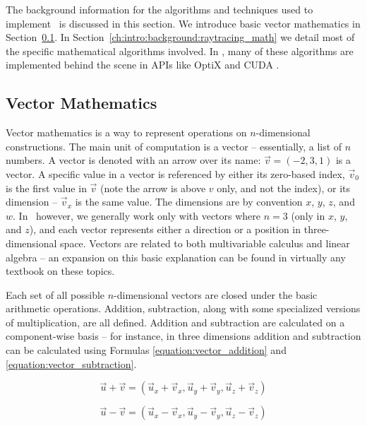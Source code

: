 The background information for the algorithms and techniques used to implement \name\ is discussed in this section.
We introduce basic vector mathematics in Section~\ref{ch:intro:background:vector_math}.
In Section~\ref{ch:intro:background:raytracing_math} we detail most of the specific mathematical algorithms involved.
In \name, many of these algorithms are implemented behind the scene in APIs like OptiX and CUDA .

\subsection{Vector Mathematics}
\label{ch:intro:background:vector_math}

Vector mathematics is a way to represent operations on $n$-dimensional constructions.
The main unit of computation is a vector -- essentially, a list of $n$ numbers.
A vector is denoted with an arrow over its name: $\vec{v} = (-2, 3, 1)$ is a vector.
A specific value in a vector is referenced by either its zero-based index, $\vec{v}_{0}$ is the first value in $\vec{v}$ (note the arrow is above $v$ only, and not the index), or its dimension -- $\vec{v}_x$ is the same value.
The dimensions are by convention $x$, $y$, $z$, and $w$.
In \name\ however, we generally work only with vectors where $n = 3$ (only in $x$, $y$, and $z$), and each vector represents either a direction or a position in three-dimensional space.
Vectors are related to both multivariable calculus and linear algebra -- an expansion on this basic explanation can be found in virtually any textbook on these topics.


Each set of all possible $n$-dimensional vectors are closed under the basic arithmetic operations.
Addition, subtraction, along with some specialized versions of multiplication, are all defined.
Addition and subtraction are calculated on a component-wise basis -- for instance, in three dimensions addition and subtraction can be calculated using Formulas \ref{equation:vector_addition} and \ref{equation:vector_subtraction}.

\begin{equation}
  \label{equation:vector_addition}
  \vec{u} + \vec{v} = (\vec{u}_x + \vec{v}_x, \vec{u}_y + \vec{v}_y, \vec{u}_z + \vec{v}_z)
\end{equation}

\begin{equation}
  \label{equation:vector_subtraction}
  \vec{u} - \vec{v} = (\vec{u}_x - \vec{v}_x, \vec{u}_y - \vec{v}_y, \vec{u}_z - \vec{v}_z)
\end{equation}

